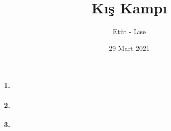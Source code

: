 \documentclass[12pt,a4paper]{article}
\title{Kış Kampı}
\author{Etüt - Lise}
\date{29 Mart 2021}
\begin{document}
\maketitle
\thispagestyle{empty}

\paragraph{1.} 

\paragraph{2.} 

\paragraph{3.} 

\newpage
\end{document}
